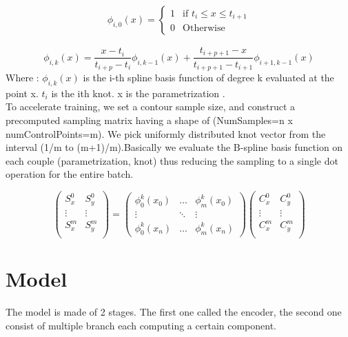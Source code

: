 \documentclass[main.tex]{subfiles}
\begin{document}
\begin{align}
    \phi_{i, 0}(x) = \begin{cases}
      1 & \text{if $t_i \leq x \leq t_{i+1}$}\\
      0 & \text{Otherwise}
      \end{cases}
\end{align}

\begin{equation}
    \phi_{i, k}(x) = \frac{x - t_i}{t_{i+p} - t_i}\phi_{i, k-1}(x) + \frac{t_{i+p+1} - x}{t_{i+p+1} - t_{i+1}}\phi_{i+1, k-1}(x)
\end{equation}
Where : $\phi_{i, k}(x)$ is the i-th spline basis  function of degree k evaluated at the point x. $t_i$ is the ith knot. x is the parametrization .\\

To accelerate training, we set a contour sample size, and construct a precomputed sampling matrix having a shape of (NumSamples=n x numControlPoints=m).
We pick uniformly distributed knot vector from the interval (1/m to (m+1)/m).Basically we evaluate the B-spline basis function on each couple (parametrization, knot) thus reducing the sampling to a single dot operation for the entire batch.


\begin{equation}
\begin{pmatrix}
    S_x^0  & S_y^0 \\
    \vdots & \vdots\\
    S_x^m  & S_y^m \\
    \end{pmatrix} = 
    \begin{pmatrix}
        \phi_0^{k}(x_0) & \dots & \phi_m^{k}(x_0)\\
        \vdots & \ddots & \vdots \\
        \phi_0^{k}(x_n) &\dots  & \phi_m^{k}(x_n)
    \end{pmatrix}
    \begin{pmatrix}
    C_x^0  & C_y^0 \\
    \vdots & \vdots\\
    C_x^m  & C_y^m \\
    \end{pmatrix}
\end{equation}


\section{Model}
The model is made of 2 stages. The first one called the encoder, the second one consist of multiple branch each computing a certain component.
\end{document}
